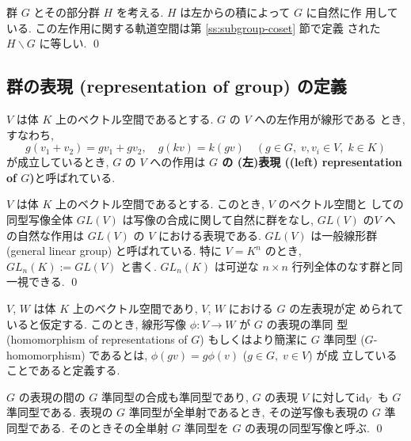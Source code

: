 \documentclass[12pt,twoside]{jarticle}
\def\id{\text{\rm id}}
\begin{document}
\begin{question}
  群 $G$ とその部分群 $H$ を考える. $H$ は左からの積によって $G$ に自然に作
  用している. 
  この左作用に関する軌道空間は第 \ref{ss:subgroup-coset} 節で定義
  された $H\backslash G$ に等しい. \qed
\end{question}


\subsection{群の表現 (representation of group) の定義}
\label{ss:def-representation}

$V$ は体 $K$ 上のベクトル空間であるとする. $G$ の $V$ への左作用が線形である
とき, すなわち,
\begin{equation*}
  g(v_1 + v_2) = gv_1 + gv_2, \quad
  g(kv) = k (gv) \quad
  (g\in G,\; v,v_i\in V,\; k\in K)
\end{equation*}
が成立しているとき, $G$ の $V$ への作用は {\bf $G$ の (左)表現 ((left)
representation of $G$)}と呼ばれている.

\begin{question}[一般線形群]
  $V$ は体 $K$ 上のベクトル空間であるとする. このとき, $V$ のベクトル空間と
  しての同型写像全体 $GL(V)$ は写像の合成に関して自然に群をなし, 
  $GL(V)$ の$V$ への自然な作用は $GL(V)$ の $V$ における表現である.
  $GL(V)$ は一般線形群 (general linear group) と呼ばれている.
  特に $V=K^n$ のとき, $GL_n(K):=GL(V)$ と書く.
  $GL_n(K)$ は可逆な $n\times n$ 行列全体のなす群と同一視できる.
  \qed
\end{question}

$V$, $W$ は体 $K$ 上のベクトル空間であり, $V$, $W$ における $G$ の左表現が定
められていると仮定する. このとき, 線形写像 $\phi:V\to W$ が $G$ の表現の準同
型 (homomorphism of representations of $G$) もしくはより簡潔に $G$ 準同型
($G$-homomorphism) であるとは, $\phi(gv)=g\phi(v)$ ($g\in G,\; v\in V$) が成
立していることであると定義する.

\begin{question}
  $G$ の表現の間の $G$ 準同型の合成も準同型であり, 
  $G$ の表現 $V$ に対して$\id_V$ も $G$ 準同型である.
  表現の $G$ 準同型が全単射であるとき, 
  その逆写像も表現の $G$ 準同型である.
  そのときその全単射 $G$ 準同型を $G$ の表現の同型写像と呼ぶ. \qed
\end{question}
\end{document}
